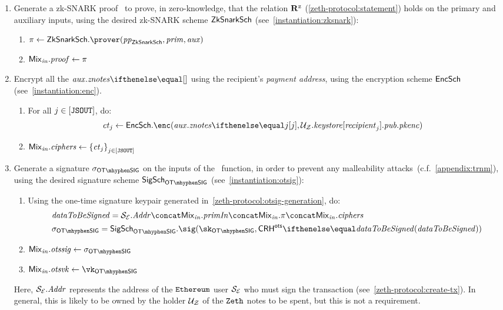 \begin{enumerate}
\begin{notebox}
    \end{notebox}
\item Generate a zk-SNARK proof \zkp~to prove, in zero-knowledge, that the relation $\mathbf{R}^{\texttt{z}}$ (\cref{zeth-protocol:statement}) holds on the primary and auxiliary inputs, using the desired zk-SNARK scheme $\mathsf{ZkSnarkSch}$ (see~\cref{instantiation:zksnark}):
    \begin{enumerate}
        \item $\zkp \gets \zksnark.\prover(\pparams_{\zksnark}, \priminputs, \auxinputs)$
        \item $\mathit{{\mathsf{Mix}}_{in}}.\mathit{proof} \gets \mathit{\pi}$
    \end{enumerate}

\item Encrypt all the $\auxinputs.\znotes{}$ using the recipient's \emph{payment address}, using the encryption scheme $\mathsf{EncSch}$ (see~\cref{instantiation:enc}).
    \begin{enumerate}
        \item For all $j \in [\mathtt{JSOUT}]$, do:
        \begin{align*}
            & \ct_j \gets \encscheme.\enc(\auxinputs.\znotes{j}, \zparty{U}.\keystore[\varstyle{recipient}_j].\pubaddr.\pkenc)
        \end{align*}
        \item $\mathit{{\mathsf{Mix}}_{in}}.\mathit{ciphers} \gets \left\{{\mathit{ct}_j}\right\}_{j \in [\mathtt{JSOUT}]}$
    \end{enumerate}
\item Generate a signature $\otsSigma$ on the inputs of the \mix~function, in order to prevent any malleability attacks~(c.f.~\cref{appendix:trnm}), using the desired signature scheme $\otsigscheme$ (see~\cref{instantiation:otsig}):
    \begin{enumerate}
        \item\label{zeth-protocol:mix-inp:create-otsig} Using the one-time signature keypair generated in~\cref{zeth-protocol:otsig-generation}, do:
            \begin{align*}
                & \datatobesigned = \eparty{S}.\addr \concat \inp{\mix}.\primInp \concat \inp{\mix}.\zkp \concat \inp{\mix}.\ciphers \\
                & \otsSigma = \otsigscheme.\sig(\sk_{\otsig}, \crhots{\datatobesigned})
            \end{align*}
        \item $\inp{\mix}.\otssig \gets \otsSigma$
        \item $\inp{\mix}.\otsvk \gets \vk_{\otsig}$
    \end{enumerate}
    Here, $\mathcal{{S}_{E}}.\mathit{Addr}$ represents the address of the $\texttt{Ethereum}{}$ user $\mathcal{{S}_{E}}$ who must sign the transaction (see~\cref{zeth-protocol:create-tx}). In general, this is likely to be owned by the holder $\mathcal{{U}_{Z}}$ of the $\texttt{Zeth}{}$ notes to be spent, but this is not a requirement.
\end{enumerate}

